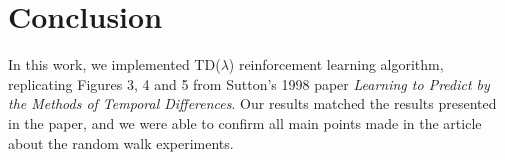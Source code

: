 \documentclass{article}
\begin{document}
\section{Conclusion}
\label{sec:conclusion}
In this work, we implemented TD($\lambda$) reinforcement learning algorithm, replicating Figures 3, 4 and 5 from Sutton's 1998 paper \emph{Learning to Predict by the Methods of Temporal Differences}.
Our results matched the results presented in the paper, and we were able to confirm all main points made in the article about the random walk experiments.



\end{document}
